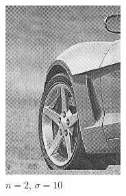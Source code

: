 \documentclass[
	12pt, %
]{style/fphw}
\begin{document}
\begin{figure}[H]
\begin{subfigure}[b]{.22\textwidth}
             \includegraphics[width=\textwidth]{Q5_3_2_10.png}
             \caption{$n=2$, $\sigma=10$}
             \label{Q5_3_2_10}
         \end{subfigure}
         \hfill
         \begin{subfigure}[b]{.22\textwidth}
             \centering

\end{subfigure}
\end{figure}
\end{document}
